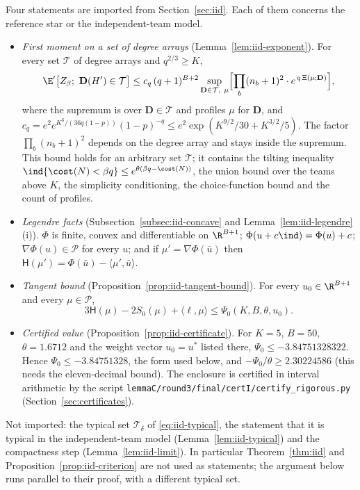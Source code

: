 Four statements are imported from Section~\ref{sec:iid}. Each of them concerns the reference
star or the independent-team model.
\begin{itemize}
\item[(I1)] \emph{First moment on a set of degree arrays}
(Lemma~\ref{lem:iid-exponent}). For every set $\mathcal T$ of degree arrays and
$q^{2/3}\ge K$,
\begin{equation}\label{eq:transfer-I1}
\E'\bigl[Z_\beta;\ \mathbf D(H')\in\mathcal T\bigr]\le c_q\,(q+1)^{B+2}
\sup_{\mathbf D\in\mathcal T,\ \mu}\Bigl[\prod_b(n_b+1)^2\cdot e^{\,q\,\Xi(\mu;\mathbf D)}\Bigr],
\end{equation}
where the supremum is over $\mathbf D\in\mathcal T$ and profiles $\mu$ for $\mathbf D$, and
$c_q=e^2e^{K^6/(36q(1-p))}(1-p)^{-q}\le e^2\exp(K^{9/2}/30+K^{3/2}/5)$. The factor
$\prod_b(n_b+1)^2$ depends on the degree array and stays inside the supremum. This bound
holds for an arbitrary set $\mathcal T$; it contains the tilting inequality
$\ind\{\cost(N)<\beta q\}\le e^{\theta(\beta q-\cost(N))}$, the union bound over the teams
above $K$, the simplicity conditioning, the choice-function bound and the count of profiles.
\item[(I2)] \emph{Legendre facts} (Subsection~\ref{subsec:iid-concave} and
Lemma~\ref{lem:iid-legendre}(i)). $\Phi$ is finite, convex and differentiable on
$\R^{B+1}$; $\Phi(u+c\ind)=\Phi(u)+c$; $\nabla\Phi(u)\in\mathcal P$ for every $u$; and if
$\mu'=\nabla\Phi(\bar u)$ then $\mathsf H(\mu')=\Phi(\bar u)-\langle\mu',\bar u\rangle$.
\item[(I3)] \emph{Tangent bound} (Proposition~\ref{prop:iid-tangent-bound}). For every
$u_0\in\R^{B+1}$ and every $\mu\in\mathcal P$,
\[
3\mathsf H(\mu)-2S_0(\mu)+\langle\ell,\mu\rangle\le\Psi_0(K,B,\theta,u_0).
\]
\item[(I4)] \emph{Certified value} (Proposition~\ref{prop:iid-certificate}). For $K=5$,
$B=50$, $\theta=1.6712$ and the weight vector $u_0=u^\ast$ listed there,
$\Psi_0\le-3.84751328322$. Hence $\Psi_0\le-3.84751328$, the form used below, and
$-\Psi_0/\theta\ge2.30224586$ (this needs the eleven-decimal bound). The enclosure is certified in interval
arithmetic by the script
\texttt{lemmaC/\allowbreak round3/\allowbreak final/\allowbreak certI/\allowbreak certify\_rigorous.py}
(Section~\ref{sec:certificates}).
\end{itemize}
Not imported: the typical set $\mathcal T_\delta$ of \eqref{eq:iid-typical}, the statement that
it is typical in the independent-team model (Lemma~\ref{lem:iid-typical}) and the compactness
step (Lemma~\ref{lem:iid-limit}). In particular Theorem~\ref{thm:iid} and
Proposition~\ref{prop:iid-criterion} are not used as statements; the argument below runs
parallel to their proof, with a different typical set.

